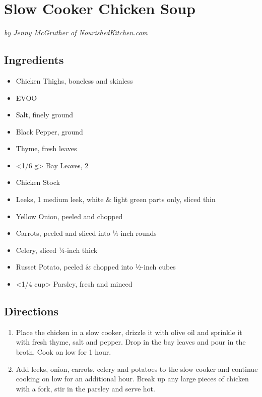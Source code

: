 \section{Slow Cooker Chicken Soup}
\textit{ by Jenny McGruther of NourishedKitchen.com }

\subsection{ Ingredients }

\begin{itemize}
  \item <2 lbs> Chicken Thighs, boneless and skinless
  \item <2 tbs> EVOO
  \item <2 tsp> Salt, finely ground
  \item <2 tsp> Black Pepper, ground
  \item <1 tsp> Thyme, fresh leaves
  \item <1/6 g> Bay Leaves, 2
  \item <6 cups> Chicken Stock
  \item <8 oz> Leeks, 1 medium leek, white \& light green parts only, sliced thin
  \item <1 onion> Yellow Onion, peeled and chopped
  \item <6> Carrots, peeled and sliced into ¼-inch rounds
  \item <6 ribs> Celery, sliced ¼-inch thick
  \item <1 lb> Russet Potato, peeled \& chopped into ½-inch cubes
  \item <1/4 cup> Parsley, fresh and minced
\end{itemize}

\subsection{ Directions }

\begin{enumerate}
    \item Place the chicken in a slow cooker, drizzle it with olive oil and sprinkle it with fresh thyme, salt and pepper. Drop in the bay leaves and pour in the broth. Cook on low for 1 hour.
    \item Add leeks, onion, carrots, celery and potatoes to the slow cooker and continue cooking on low for an additional hour. Break up any large pieces of chicken with a fork, stir in the parsley and serve hot.
\end{enumerate}
